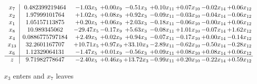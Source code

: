 \documentclass[8pt]{article}
\begin{document}
 \[\begin{array}{c| c c@{\hskip 2pt} c@{\hskip 2pt} c@{\hskip 2pt} c@{\hskip 2pt} c@{\hskip 2pt} c@{\hskip 2pt} c@{\hskip 2pt} }
 x_{7}   &  0.482399219464 & -1.03 x_{5} & +  0.00 x_{9} & -0.51 x_{3} & +  0.10 x_{11} & +  0.07 x_{10} & -0.02 x_{14} & +  0.06 x_{12}\\
 x_{2}   &  1.97999101764 & +  1.02 x_{5} & +  0.08 x_{9} & +  0.92 x_{3} & -0.09 x_{11} & -0.03 x_{10} & -0.04 x_{14} & -0.06 x_{12}\\
 x_{1}   &  1.05157113875 & +  0.20 x_{5} & +  0.06 x_{9} & +  2.03 x_{3} & -0.18 x_{11} & -0.06 x_{10} & -0.00 x_{14} & +  0.06 x_{12}\\
 x_{8}   &  10.989345062 & -29.47 x_{5} & -0.17 x_{9} & +  5.63 x_{3} & -0.08 x_{11} & +  1.01 x_{10} & -0.07 x_{14} & +  1.62 x_{12}\\
 x_{4}   &  0.0886775797184 & +  2.49 x_{5} & +  0.02 x_{9} & +  0.94 x_{3} & -0.07 x_{11} & -0.17 x_{10} & +  0.00 x_{14} & -0.14 x_{12}\\
 x_{13}   &  32.2601167707 & + 10.71 x_{5} & +  0.97 x_{9} & + 33.10 x_{3} & -2.89 x_{11} & -0.62 x_{10} & -0.50 x_{14} & -0.28 x_{12}\\
 x_{6}   &  1.12329064131 & -1.47 x_{5} & +  0.01 x_{9} & -0.56 x_{3} & +  0.09 x_{11} & +  0.08 x_{10} & +  0.08 x_{14} & +  0.06 x_{12}\\
\hline
z    &  9.71982778647 & -2.40 x_{5} & +  0.46 x_{9} & + 13.72 x_{3} & -0.99 x_{11} & +  0.20 x_{10} & -0.22 x_{14} & +  0.59 x_{12}\\
\end{array}\]


 $ x_{3} $ enters and $ x_{7} $ leaves 
\end{document}
